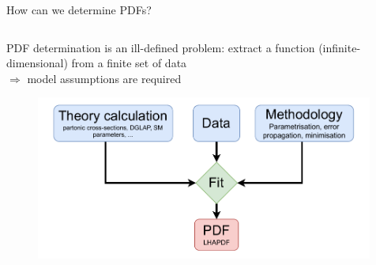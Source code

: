 \documentclass[8pt,t]{beamer}
\begin{document}
\begin{frame}{How can we determine PDFs?}
  \begin{columns}
    \begin{column}{0.5\textwidth}
      PDF determination is an ill-defined problem: extract a function (infinite-dimensional) from a finite set of data \\
      $\Rightarrow$ model assumptions are required

      \begin{figure}
        \includegraphics[width=0.99\textwidth]{pdffitflowchart.pdf}
      \end{figure}



\end{column}
\end{columns}
\end{frame}
\end{document}

